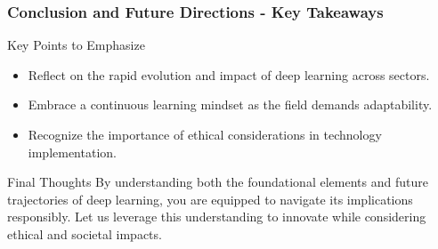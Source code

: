 \documentclass[aspectratio=169]{beamer}
\begin{document}
\begin{frame}[fragile]
    \frametitle{Conclusion and Future Directions - Key Takeaways}
    \begin{block}{Key Points to Emphasize}
        \begin{itemize}
            \item Reflect on the rapid evolution and impact of deep learning across sectors.
            \item Embrace a continuous learning mindset as the field demands adaptability.
            \item Recognize the importance of ethical considerations in technology implementation.
        \end{itemize}
    \end{block}
    \begin{block}{Final Thoughts}
        By understanding both the foundational elements and future trajectories of deep learning, you are equipped to navigate its implications responsibly. Let us leverage this understanding to innovate while considering ethical and societal impacts.
    \end{block}
\end{frame}
\end{document}
